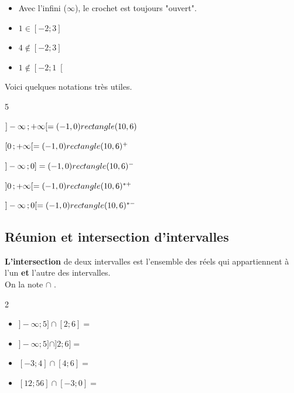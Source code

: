 \begin{Remarque} 
\vspace{-0.5cm}
\begin{itemize}[label=\textcolor{Couleur7}{$\bullet$}]
\item Avec l'infini ($\infty$), le crochet est toujours "ouvert".
\item $1 \in \left[ -2 ; 3\right ]$
\item $4 \notin \left[ -2 ; 3\right ]$
\item $1 \notin \left[ -2 ; 1\right [$
\end{itemize}
\end{Remarque}


\newpage


\begin{Remarque}
Voici quelques notations très utiles.
\begin{multicols}{5}
\item $]-\infty \mathpunct{} ; +\infty [ =(-1,0) rectangle (10,6)$
\item $ [ 0 \mathpunct{} ; +\infty [ = (-1,0) rectangle (10,6)^+$
\item $]-\infty \mathpunct{} ; 0 ] =(-1,0) rectangle (10,6)^-$
\item $ ] 0 \mathpunct{} ; +\infty [ = (-1,0) rectangle (10,6)^{\ast+}$
\item $]-\infty \mathpunct{} ; 0 [ =(-1,0) rectangle (10,6)^{\ast-}$
\end{multicols}
\end{Remarque}

\subsection{Réunion et intersection d'intervalles}

\begin{Définition}
{\bf{L'intersection}} de deux intervalles est l'ensemble des réels qui appartiennent à l'un {\bf{et}} l'autre des intervalles. \\
On la note $\cap$ .
\end{Définition}

\begin{Exemples} 
\leavevmode\vspace{-\baselineskip}
\vspace{-0.5cm}
\setlength{\columnsep}{2cm}
\begin{multicols}{2}
\begin{itemize}[label=\textcolor{Couleur10}{$\bullet$}]
\item $]-\infty\mathpunct{} ;5]\cap[2\mathpunct{} ;6]=$ \pointille{5cm}
\item $]-\infty\mathpunct{} ;5]\cap]2\mathpunct{} ;6]=$ \pointille{5cm}
\item $[-3\mathpunct{} ;4]\cap[4\mathpunct{} ;6]=$ \pointille{5cm}
\item $[12\mathpunct{} ;56]\cap[-3\mathpunct{} ;0]=$ \pointille{5cm}
\end{itemize}
\end{multicols}
\end{Exemples}

